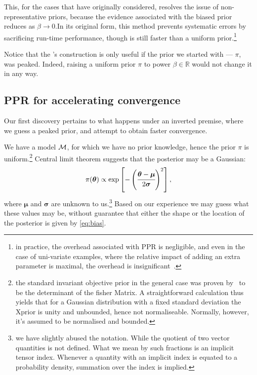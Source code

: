 \documentclass[usenatbib]{mnras}
\begin{document}
This, for the cases that \citeauthor{chen-ferroz-hobson} have
originally considered, resolves the issue of non-representative
priors, because the evidence associated with the biased prior reduces
as \(\beta\rightarrow0\).In its original form, this method prevents
systematic errors by sacrificing run-time performance, though is still
faster than a uniform prior.\footnote{in practice, the overhead associated with PPR is negligible, and even in the case of uni-variate examples, where the relative impact of adding an extra  parameter is maximal, the overhead is insignificant~\cite[see][section ``numerical examples'']{chen-ferroz-hobson}.}

Notice that the \citeauthor{chen-ferroz-hobson}'s construction is
only useful if the prior we started with --- \(\pi\), was
peaked. Indeed, raising a uniform prior \(\pi\) to power \(\beta \in
   \mathbb{R}\) would not change it in any way.

\subsection{PPR for  accelerating convergence}\label{sec:orgc5b20bb}

Our first discovery pertains to what happens under an inverted
premise, where we guess a peaked prior, and attempt to obtain
faster convergence. 

We have a model \({\cal M}\), for which we have no prior knowledge,
hence the prior \(\pi\) is uniform.\footnote{the standard invariant objective prior in the general case was proven by~\cite{JeffreysPrior} to be the determinant of the fisher Matrix. A straightforward calculation thus yields that for a Gaussian distribution with a fixed standard deviation the Xprior is unity and unbounded, hence not normaliseable. Normally, however, it's assumed to be normalised and bounded.} Central limit theorem
suggests that the posterior may be a Gaussian:
\begin{equation}
 \pi (\bm{\theta}) \propto \exp \left[-\left(\cfrac{\bm{\theta} - \bm{\mu}}{2\bm{\sigma}}\right)^{2} \right],
 \label{eq:bias}
\end{equation}
where \(\bm{\mu}\) and \(\bm{\sigma}\) are unknown to us.\footnote{we
have slightly abused the notation. While the quotient of two vector
quantities is not defined. What we mean by such fractions is an
implicit tensor index. Whenever a quantity with an implicit index
is equated to a probability density, summation over the index is implied.} Based on
our experience we may guess what these values may be, without
guarantee that either the shape or the location of the posterior is
given by \cref{eq:bias}.
\end{document}
